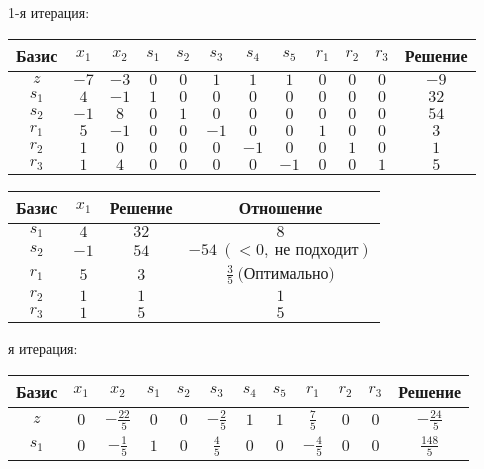 \documentclass{article}%
\begin{document}
\begin{flushleft}%
1{-}я итерация: %
\newline%
\newline%
\renewcommand{\arraystretch}{1.3}%
\begin{tabular}{|c|cccccccccc|c|}%
\hline%
Базис&$x_{1}$&$x_{2}$&$s_{1}$&$s_{2}$&$s_{3}$&$s_{4}$&$s_{5}$&$r_{1}$&$r_{2}$&$r_{3}$&Решение\\%
\hline%
$z$&$-7$&$-3$&$0$&$0$&$1$&$1$&$1$&$0$&$0$&$0$&$-9$\\%
\hline%
$s_{1}$&$4$&$-1$&$1$&$0$&$0$&$0$&$0$&$0$&$0$&$0$&$32$\\%
$s_{2}$&$-1$&$8$&$0$&$1$&$0$&$0$&$0$&$0$&$0$&$0$&$54$\\%
$r_{1}$&$5$&$-1$&$0$&$0$&$-1$&$0$&$0$&$1$&$0$&$0$&$3$\\%
$r_{2}$&$1$&$0$&$0$&$0$&$0$&$-1$&$0$&$0$&$1$&$0$&$1$\\%
$r_{3}$&$1$&$4$&$0$&$0$&$0$&$0$&$-1$&$0$&$0$&$1$&$5$\\%
\hline%
\end{tabular}%
\newline%
\newline%
\newline%
\begin{tabular}{|cccc|}%
\hline%
Базис&$x_{1}$&Решение&Отношение\\%
\hline%
$s_{1}$&$4$&$32$&$8$\\%
$s_{2}$&$-1$&$54$&$-54\: (< 0, \: \text{не подходит})$\\%
$r_{1}$&$5$&$3$&$\frac{3}{5}\: \text{(Оптимально)}$\\%
$r_{2}$&$1$&$1$&$1$\\%
$r_{3}$&$1$&$5$&$5$\\%
\hline%
\end{tabular}%
\newline%
\newline%
я итерация: %
\newline%
\newline%
\renewcommand{\arraystretch}{1.3}%
\begin{tabular}{|c|cccccccccc|c|}%
\hline%
Базис&$x_{1}$&$x_{2}$&$s_{1}$&$s_{2}$&$s_{3}$&$s_{4}$&$s_{5}$&$r_{1}$&$r_{2}$&$r_{3}$&Решение\\%
\hline%
$z$&$0$&$-\frac{22}{5}$&$0$&$0$&$-\frac{2}{5}$&$1$&$1$&$\frac{7}{5}$&$0$&$0$&$-\frac{24}{5}$\\%
\hline%
$s_{1}$&$0$&$-\frac{1}{5}$&$1$&$0$&$\frac{4}{5}$&$0$&$0$&$-\frac{4}{5}$&$0$&$0$&$\frac{148}{5}$\\%

\end{tabular}
\end{flushleft}
\end{document}
